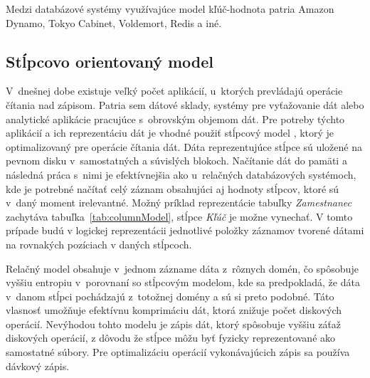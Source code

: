 \documentclass[11pt,twoside,a4paper]{book}
\begin{document}
Medzi databázové systémy využívajúce model kľúč-hodnota patria Amazon Dynamo, Tokyo Cabinet, Voldemort, Redis a iné.

\subsection{Stĺpcovo orientovaný model}


V~dnešnej dobe existuje veľký počet aplikácií, u~ktorých prevládajú operácie čítania nad zápisom. Patria sem dátové sklady, systémy pre vyťažovanie dát alebo analytické aplikácie pracujúce s~obrovským objemom dát. Pre potreby týchto aplikácií a ich reprezentáciu dát je vhodné použiť stĺpcový model \cite{abadi2009column, abadi2009}, ktorý je optimalizovaný pre operácie čítania dát. Dáta reprezentujúce stĺpce sú uložené na pevnom disku v~samostatných a súvislých blokoch. Načítanie dát do pamäti a následná práca s~nimi je efektívnejšia ako u~relačných databázových systémoch, kde je potrebné načítať celý záznam obsahujúci aj hodnoty stĺpcov, ktoré sú v~daný moment irelevantné. Možný príklad reprezentácie tabuľky \emph{Zamestnanec} zachytáva tabuľka~\ref{tab:columnModel}, stĺpce \emph{Kľúč} je možne vynechať. V tomto prípade budú v logickej reprezentácii jednotlivé položky záznamov tvorené dátami na rovnakých pozíciach v daných stĺpcoch.

Relačný model obsahuje v~jednom zázname dáta z~rôznych domén, čo spôsobuje vyššiu entropiu v~porovnaní so stĺpcovým modelom, kde sa predpokladá, že dáta v~danom stĺpci pochádzajú z~totožnej domény a sú si preto podobné. Táto vlasnosť umožňuje efektívnu komprimáciu dát, ktorá znižuje počet diskových operácií. Nevýhodou tohto modelu je zápis dát, ktorý spôsobuje vyššiu záťaž diskových operácií, z dôvodu že stĺpce môžu byť fyzicky reprezentované ako samostatné súbory. Pre optimalizáciu operácií vykonávajúcich zápis sa používa dávkový zápis.

\end{document}
